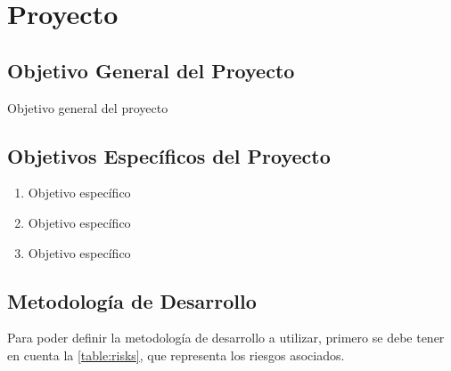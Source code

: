 \chapter{Proyecto}

\section{Objetivo General del Proyecto}
Objetivo general del proyecto

\section{Objetivos Específicos del Proyecto}
\begin{enumerate}
	\item Objetivo específico
	\item Objetivo específico
	\item Objetivo específico
\end{enumerate}

\section{Metodología de Desarrollo}
Para poder definir la metodología de desarrollo a utilizar, primero se debe tener en cuenta la \autoref{table:risks}, que representa los riesgos asociados.

